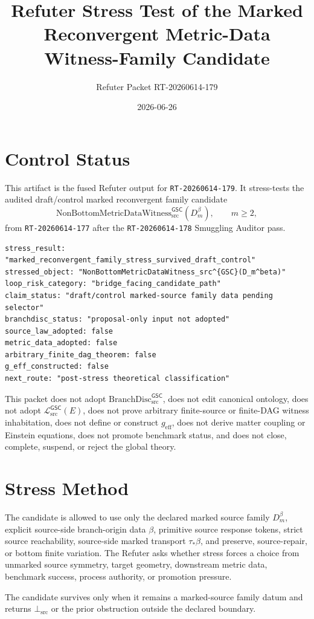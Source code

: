 \documentclass[11pt]{article}
\title{Refuter Stress Test of the Marked Reconvergent Metric-Data Witness-Family Candidate}
\author{Refuter Packet RT-20260614-179}
\date{2026-06-26}
\newcommand{\Witness}{\mathrm{NonBottomMetricDataWitness}_{\mathrm{src}}^{\mathsf{GSC}}}
\newcommand{\MetricData}{\mathcal{L}_{\mathrm{src}}^{\mathsf{GSC}}}
\newcommand{\BottomSrc}{\bot_{\mathrm{src}}}
\newcommand{\geff}{g_{\mathrm{eff}}}
\newcommand{\BranchDisc}{\mathrm{BranchDisc}_{\mathrm{src}}^{\mathsf{GSC}}}
\newcommand{\Dmbeta}{D_m^{\beta}}
\begin{document}
\maketitle

\section{Control Status}

This artifact is the fused Refuter output for \texttt{RT-20260614-179}. It
stress-tests the audited draft/control marked reconvergent family candidate
\[
  \Witness(\Dmbeta),\qquad m\ge 2,
\]
from \texttt{RT-20260614-177} after the \texttt{RT-20260614-178} Smuggling
Auditor pass.

\begin{verbatim}
stress_result: "marked_reconvergent_family_stress_survived_draft_control"
stressed_object: "NonBottomMetricDataWitness_src^{GSC}(D_m^beta)"
loop_risk_category: "bridge_facing_candidate_path"
claim_status: "draft/control marked-source family data pending selector"
branchdisc_status: "proposal-only input not adopted"
source_law_adopted: false
metric_data_adopted: false
arbitrary_finite_dag_theorem: false
g_eff_constructed: false
next_route: "post-stress theoretical classification"
\end{verbatim}

This packet does not adopt \(\BranchDisc\), does not edit canonical ontology,
does not adopt \(\MetricData(E)\), does not prove arbitrary finite-source or
finite-DAG witness inhabitation, does not define or construct \(\geff\), does
not derive matter coupling or Einstein equations, does not promote benchmark
status, and does not close, complete, suspend, or reject the global theory.

\section{Stress Method}

The candidate is allowed to use only the declared marked source family
\(\Dmbeta\), explicit source-side branch-origin data \(\beta\), primitive
source response tokens, strict source reachability, source-side marked
transport \(\tau_\ast\beta\), and preserve, source-repair, or bottom finite
variation. The Refuter asks whether stress forces a choice from unmarked
source symmetry, target geometry, downstream metric data, benchmark success,
process authority, or promotion pressure.

The candidate survives only when it remains a marked-source family datum and
returns \(\BottomSrc\) or the prior obstruction outside the declared boundary.
\end{document}
